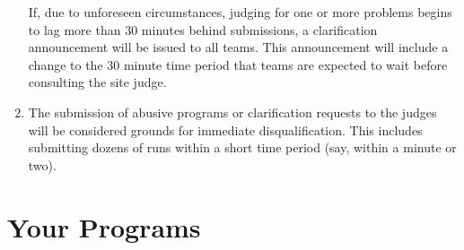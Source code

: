 \begin{enumerate}
If, due to unforeseen circumstances, judging for one or more problems
begins to lag more than 30 minutes behind submissions, a clarification
announcement will be issued to all teams.  This announcement will
include a change to the 30 minute time period that teams are expected
to wait before consulting the site judge.

\item The submission of abusive programs or clarification requests to
  the judges will be considered grounds for immediate
  disqualification.  This includes submitting dozens of runs within a
  short time period (say, within a minute or two).

\end{enumerate}

\section*{Your Programs}

